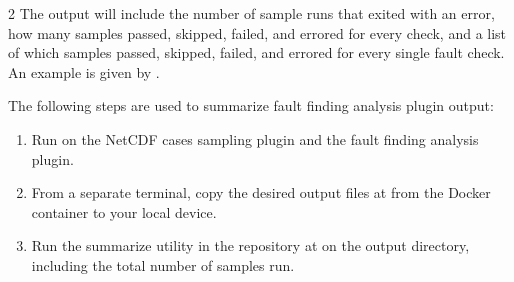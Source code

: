 \documentclass[10pt]{article}
\begin{document}
\begin{multicols}{2}
The output will include the number of sample runs that exited with an error, how many samples passed, skipped, failed, and errored for every check, and a list of which samples passed, skipped, failed, and errored for every single fault check. An example is given by . 

The following steps are used to summarize fault finding analysis plugin output:
\begin{enumerate}
    \item Run  on the NetCDF cases sampling plugin and the fault finding analysis plugin. 
    \item From a separate terminal, copy the desired output files at  from the Docker container to your local device.
    \item Run the summarize utility in the repository at  on the output directory, including the total number of samples run. 
\end{enumerate}

\end{multicols}
\end{document}
